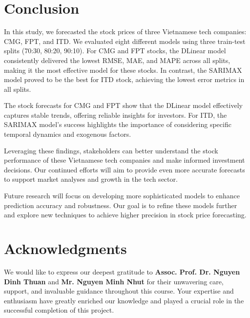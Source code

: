 \documentclass{ieeeojies}
\begin{document}
\section{Conclusion}
In this study, we forecasted the stock prices of three Vietnamese tech companies: CMG, FPT, and ITD. We evaluated eight different models using three train-test splits (70:30, 80:20, 90:10). For CMG and FPT stocks, the DLinear model consistently delivered the lowest RMSE, MAE, and MAPE across all splits, making it the most effective model for these stocks. In contrast, the SARIMAX model proved to be the best for ITD stock, achieving the lowest error metrics in all splits.

The stock forecasts for CMG and FPT show that the DLinear model effectively captures stable trends, offering reliable insights for investors. For ITD, the SARIMAX model's success highlights the importance of considering specific temporal dynamics and exogenous factors.

Leveraging these findings, stakeholders can better understand the stock performance of these Vietnamese tech companies and make informed investment decisions. Our continued efforts will aim to provide even more accurate forecasts to support market analyses and growth in the tech sector.

Future research will focus on developing more sophisticated models to enhance prediction accuracy and robustness. Our goal is to refine these models further and explore new techniques to achieve higher precision in stock price forecasting.
\section*{Acknowledgments}
We would like to express our deepest gratitude to \textbf{Assoc. Prof. Dr. Nguyen Dinh Thuan} and \textbf{Mr. Nguyen Minh Nhut} for their unwavering care, support, and invaluable guidance throughout this course. Your expertise and enthusiasm have greatly enriched our knowledge and played a crucial role in the successful completion of this project.
\end{document}
